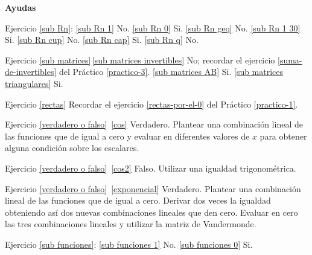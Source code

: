 \begin{enumerate}[resume, topsep=6pt, itemsep=.4cm]
\begin{enumerate}
    \end{enumerate}


\end{enumerate}

%
%
%
%
%
%         
%

\textbf{Ayudas}

Ejercicio \ref{sub Rn}: 
\ref{sub Rn 1} No. \ref{sub Rn 0} Si. \ref{sub Rn geq} No. \ref{sub Rn 1 30} Si. \ref{sub Rn cup} No. \ref{sub Rn cap} Si. \ref{sub Rn q} No.


Ejercicio \ref{sub matrices}\,\ref{sub matrices invertibles} No; recordar el ejercicio \ref{suma-de-invertibles} del Práctico  \ref{practico-3}. \ref{sub matrices AB} Si. \ref{sub matrices triangulares} Si.

Ejercicio \ref{rectas} Recordar el ejercicio \ref{rectas-por-el-0} del Práctico  \ref{practico-1}.

Ejercicio \ref{verdadero o falso}\, \ref{cos} Verdadero. Plantear una combinación lineal de las funciones que de igual a cero y evaluar en diferentes valores de $x$ para obtener alguna condición sobre los escalares.

Ejercicio \ref{verdadero o falso}\, \ref{cos2} Falso. Utilizar una igualdad trigonométrica.

Ejercicio \ref{verdadero o falso}\, \ref{exponencial} Verdadero. Plantear una combinación lineal de las funciones que de igual a cero. Derivar dos veces la igualdad obteniendo así dos nuevas combinaciones lineales que den cero. Evaluar en cero las tres combinaciones lineales y utilizar la matriz de Vandermonde.

Ejercicio \ref{sub funciones}: \ref{sub funciones 1} No. \ref{sub funciones 0} Si.

